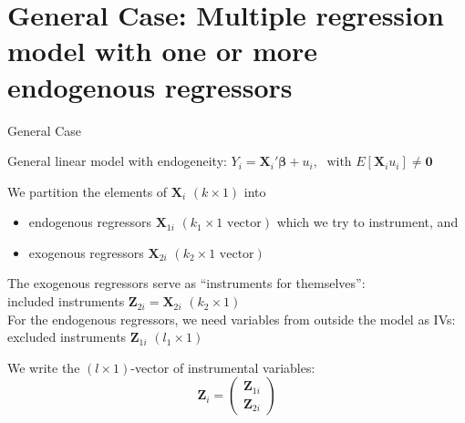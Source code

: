 \documentclass[11pt, aspectratio = 169]{beamer}
\begin{document}
\section{General Case: Multiple regression model with one or more endogenous regressors}

\begin{frame}{General Case}

General linear model with endogeneity:
$Y_i = \boldsymbol{X}_i'\boldsymbol{\beta} + u_i,\; \text{ with } E[\boldsymbol{X}_i u_i] \neq \boldsymbol{0}$

We partition the elements of $\boldsymbol{X}_i$ {\color{gray}$(k \times 1)$} into
\begin{itemize}
    \item endogenous regressors $\boldsymbol{X}_{1i}$ {\color{gray}$(k_1 \times 1\text{ vector})$} which we try to instrument, and
    \item exogenous regressors $\boldsymbol{X}_{2i}$ {\color{gray}$(k_2 \times 1\text{ vector})$}
\end{itemize}

\vspace{0.15cm}
The exogenous regressors serve as ``instruments for themselves'': \\
\hspace{0.25cm}\alert{included instruments} $\boldsymbol{Z}_{2i} = \boldsymbol{X}_{2i}$ {\color{gray}$(k_2 \times 1)$} \\[0.1cm]
For the endogenous regressors, we need variables from outside the model as IVs: \\
\hspace{0.25cm}\alert{excluded instruments} $\boldsymbol{Z}_{1i}$ {\color{gray}$(l_1 \times 1)$}

\vspace{0.15cm}
We write the {\color{gray}$(l \times 1)$}-vector of instrumental variables:
\[
\boldsymbol{Z}_i = 
\begin{pmatrix}
    \boldsymbol{Z}_{1i} \\
    \boldsymbol{Z}_{2i}
\end{pmatrix}
\]

\end{frame}
\end{document}
